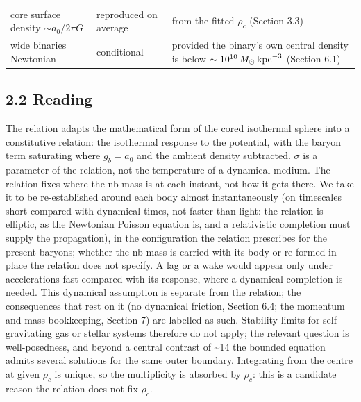 \documentclass[
  10pt,
]{article}
\begin{document}
\begin{longtable}[]{@{}lll@{}}
\begin{minipage}[t]{0.24\columnwidth}
core surface density $\sim a_0/2\pi G$\strut
\end{minipage} & \begin{minipage}[t]{0.20\columnwidth}\raggedright
reproduced on average\strut
\end{minipage} & \begin{minipage}[t]{0.50\columnwidth}\raggedright
from the fitted $\rho_c$ (Section 3.3)\strut
\end{minipage}\tabularnewline
\begin{minipage}[t]{0.24\columnwidth}\raggedright
wide binaries Newtonian\strut
\end{minipage} & \begin{minipage}[t]{0.20\columnwidth}\raggedright
conditional\strut
\end{minipage} & \begin{minipage}[t]{0.50\columnwidth}\raggedright
provided the binary's own central density is below $\sim10^{10}\,M_\odot\,{\rm kpc}^{-3}$ (Section 6.1)\strut
\end{minipage}\tabularnewline
\bottomrule
\end{longtable}

\subsection{2.2 Reading}\label{reading}

The relation adapts the mathematical form of the cored isothermal sphere into
a constitutive relation: the isothermal response to the potential, with
the baryon term saturating where $g_b=a_0$ and the ambient density
subtracted. $\sigma$ is a parameter of the relation, not the temperature of a
dynamical medium. The relation fixes where the nb mass is at each instant,
not how it gets there. We take it to be re-established around each body
almost instantaneously (on timescales short compared with dynamical times, not faster than light: the relation is elliptic, as the Newtonian Poisson equation is, and a relativistic completion must supply the propagation), in the configuration the relation prescribes for the
present baryons; whether the nb mass is carried with its body or re-formed
in place the relation does not specify. A lag or a wake would appear only under
accelerations fast compared with its response, where a dynamical
completion is needed. This dynamical assumption is separate from the relation;
the consequences that rest on it (no dynamical friction, Section 6.4; the
momentum and mass bookkeeping, Section 7) are labelled as such. Stability limits for self-gravitating gas or
stellar systems therefore do not apply; the relevant question is
well-posedness, and beyond a central contrast of \textasciitilde{}14 the
bounded equation admits several solutions for the same outer boundary.
Integrating from the centre at given $\rho_c$ is unique, so the
multiplicity is absorbed by $\rho_c$: this is a candidate reason the relation
does not fix $\rho_c$.
\end{document}
